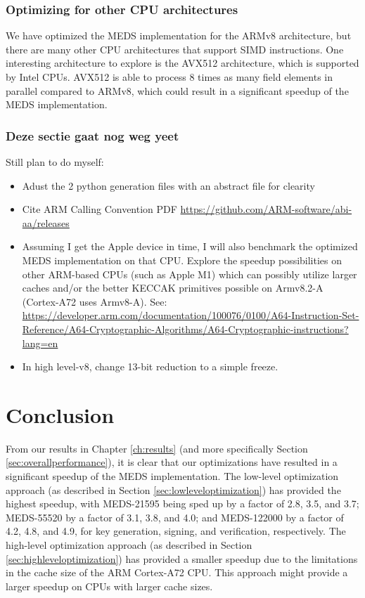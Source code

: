 \documentclass[11pt,a4paper]{report}
\theoremstyle{definition}
\begin{document}
\subsection*{Optimizing for other CPU architectures}
We have optimized the MEDS implementation for the ARMv8 architecture, but there are many other CPU architectures that support SIMD instructions. One interesting architecture to explore is the AVX512 architecture, which is supported by Intel CPUs. AVX512 is able to process 8 times as many field elements in parallel compared to ARMv8, which could result in a significant speedup of the MEDS implementation.

\subsection*{Deze sectie gaat nog weg yeet}
Still plan to do myself:
\begin{itemize}
  \item Adust the 2 python generation files with an abstract file for clearity
  \item Cite ARM Calling Convention PDF \url{https://github.com/ARM-software/abi-aa/releases}
  \item Assuming I get the Apple device in time, I will also benchmark the optimized MEDS implementation on that CPU. Explore the speedup possibilities on other ARM-based CPUs (such as Apple M1) which can possibly utilize larger caches and/or the better KECCAK primitives possible on Armv8.2-A (Cortex-A72 uses Armv8-A). See: \url{https://developer.arm.com/documentation/100076/0100/A64-Instruction-Set-Reference/A64-Cryptographic-Algorithms/A64-Cryptographic-instructions?lang=en}
  \item In high level-v8, change 13-bit reduction to a simple freeze.
\end{itemize}

\chapter{Conclusion}
\label{ch:conclusion}
From our results in Chapter \ref{ch:results} (and more specifically Section \ref{sec:overallperformance}), it is clear that our optimizations have resulted in a significant speedup of the MEDS implementation. The low-level optimization approach (as described in Section \ref{sec:lowleveloptimization}) has provided the highest speedup, with MEDS-21595 being sped up by a factor of 2.8, 3.5, and 3.7; MEDS-55520 by a factor of 3.1, 3.8, and 4.0; and MEDS-122000 by a factor of 4.2, 4.8, and 4.9, for key generation, signing, and verification, respectively. The high-level optimization approach (as described in Section \ref{sec:highleveloptimization}) has provided a smaller speedup due to the limitations in the cache size of the ARM Cortex-A72 CPU. This approach might provide a larger speedup on CPUs with larger cache sizes.
\end{document}

